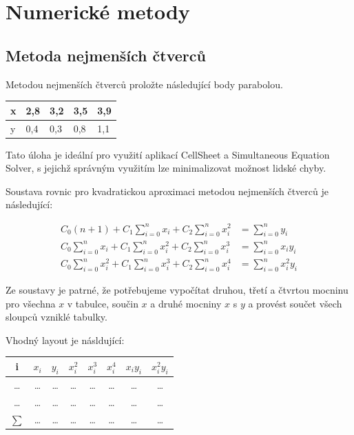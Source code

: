 \documentclass[10pt,a4paper,float]{article}
\begin{document}
\pagebreak

\section{Numerické metody}
\subsection{Metoda nejmenších čtverců}
Metodou nejmenších čtverců proložte následující body parabolou.

\begin{table}[H]
	\centering
	\begin{tabular}{l|l|l|l|l}
		x & 2,8 & 3,2 & 3,5 & 3,9 \\ \hline
		y & 0,4 & 0,3 & 0,8 & 1,1
	\end{tabular}
\end{table}

Tato úloha je ideální pro využití aplikací CellSheet a Simultaneous Equation Solver, s jejichž správným využitím lze minimalizovat možnost lidské chyby.

Soustava rovnic pro kvadratickou aproximaci metodou nejmenších čtverců je následující:

\begin{align*}
	C_0 (n + 1) + C_1 \sum_{i=0}^{n} x_i + C_2 \sum_{i=0}^{n} x_i^2 &= \sum_{i=0}^{n} y_i \\
	C_0 \sum_{i=0}^{n} x_i + C_1 \sum_{i=0}^{n} x_i^2 + C_2 \sum_{i=0}^{n} x_i^3 &= \sum_{i=0}^{n} x_i y_i \\
	C_0 \sum_{i=0}^{n} x_i^2 + C_1 \sum_{i=0}^{n} x_i^3 + C_2 \sum_{i=0}^{n} x_i^4 &= \sum_{i=0}^{n} x_i^2 y_i
\end{align*}

Ze soustavy je patrné, že potřebujeme vypočítat druhou, třetí a čtvrtou mocninu pro všechna $x$ v tabulce, součin $x$ a druhé mocniny $x$ s $y$ a provést součet všech sloupců vzniklé tabulky.

Vhodný layout je násldující:

\begin{table}[H]
	\centering
	\begin{tabular}{c|c|c|c|c|c|c|c}
		i & $x_i$ & $y_i$ & $x_i^2$ & $x_i^3$ & $x_i^4$ & $x_i y_i$ & $x_i^2 y_i$ \\ \hline
		\dots & \dots & \dots & \dots & \dots & \dots & \dots & \dots \\
		\dots & \dots & \dots & \dots & \dots & \dots & \dots & \dots \\ \hline
		$\sum$ & \dots & \dots & \dots & \dots & \dots & \dots & \dots \\
	\end{tabular}
\end{table}
\end{document}

